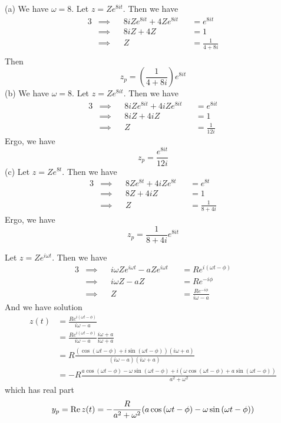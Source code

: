 \documentclass[a4paper]{article}
\begin{document}
(a) We have \(\omega = 8\). Let \(z = Ze^{8it}\). Then we have
\begin{alignat*}{3}
	&\implies && 8iZe^{8it } + 4Ze^{8it } && = e^{8it } \\
	&\implies && 8iZ + 4Z && = 1 \\
	&\implies && Z && = \frac{1}{4 + 8i} \\ 
\end{alignat*}
Then
\[
	z_{p} = \!\left( \frac{1}{4 + 8i} \right) e^{8it }
\]
(b) We have \(\omega = 8\). Let \(z = Ze^{8it }\). Then we have
\begin{alignat*}{3}
	&\implies && 8iZe^{8it } + 4iZe^{8it} && = e^{8it } \\
	&\implies && 8iZ + 4iZ && = 1 \\ 
	&\implies && Z && = \frac{1}{12i}
\end{alignat*}
Ergo, we have
\[
	z_{p} = \frac{e^{8it }}{12i}
\]
(c) Let \(z = Ze^{8t}\). Then we have
\begin{alignat*}{3}
	&\implies && 8Ze^{8t} + 4iZe^{8t} && = e^{8t} \\
	&\implies && 8Z + 4iZ && = 1 \\ 
	&\implies && Z && = \frac{1}{8 + 4i}
\end{alignat*}
Ergo, we have
\[
	z_{p} = \frac{1}{8 + 4i} e^{8it}
\]


Let \(z = Ze^{i \omega t}\). Then we have
\begin{alignat*}{3}
	&\implies && i \omega Ze^{i \omega t} - aZe^{i \omega t} && = Re^{i \!\left( \omega t - \phi  \right) } \\
	&\implies && i \omega Z - aZ && = Re^{-i \phi } \\ 
	&\implies && Z && = \frac{Re^{-i \phi }}{i \omega - a}
\end{alignat*}
And we have solution
\begin{align*}
	z \!\left( t \right) & = \frac{Re^{i \!\left( \omega t - \phi  \right) }}{i \omega - a} \\
			     & = \frac{Re^{i \!\left( \omega t - \phi  \right) }}{i \omega - a} \frac{i \omega + a}{i \omega + a} \\
			     & = R \frac{\!\left(\cos\left( \omega t - \phi  \right) + i \sin\left( \omega t - \phi  \right)\right) \!\left( i \omega + a \right) }{\!\left( i \omega - a \right) \!\left( i \omega + a \right) } \\
			     & = -R \frac{a \cos\left( \omega t - \phi  \right) - \omega \sin\left( \omega t - \phi  \right) + i \!\left( \omega \cos\left( \omega t - \phi  \right) + a \sin\left( \omega t - \phi  \right) \right) }{a^{2} + \omega^{2} }
\end{align*}
which has real part
\[
	y_{p} = \operatorname{Re} z \!\left( t \right) = -\frac{R}{a^{2} + \omega^{2}} \!\left( a \cos\left( \omega t - \phi  \right) - \omega \sin\left( \omega t - \phi  \right) \right) 
\]
\end{document}
